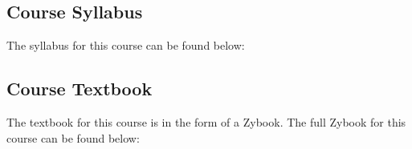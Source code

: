 \subsection{Course Syllabus}

The syllabus for this course can be found below: 

\subsection{Course Textbook}

The textbook for this course is in the form of a Zybook. The full Zybook for this course can be found below: 
